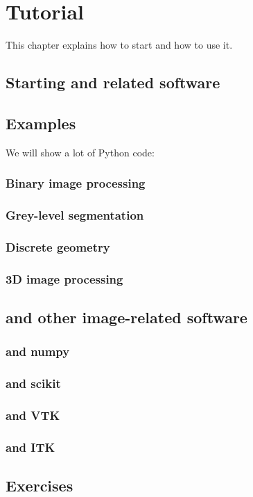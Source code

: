 \chapter{Tutorial}\label{chap:tutorial}
This chapter explains how to start \Pink and how to use it.

\section{Starting \Pink and related software}


\section{Examples}

We will show a lot of Python code:



\subsection{Binary image processing}

\subsection{Grey-level segmentation}

\subsection{Discrete geometry}

\subsection{3D image processing}

\section{\Pink and other image-related software}

\subsection{\Pink and numpy}

\subsection{\Pink and scikit}

\subsection{\Pink and VTK}

\subsection{\Pink and ITK}

\section{Exercises}

